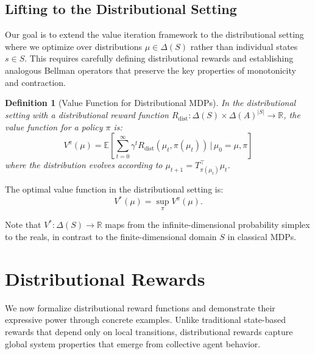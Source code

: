 \documentclass{article}
\newcommand{\ak}[1]{\textcolor{red}{ak: #1}}
\newtheorem{definition}{Definition}
\begin{document}


\subsection{Lifting to the Distributional Setting}

Our goal is to extend the value iteration framework to the distributional setting where we optimize over distributions $\mu \in \Delta(S)$ rather than individual states $s \in S$. This requires carefully defining distributional rewards and establishing analogous Bellman operators that preserve the key properties of monotonicity and contraction.

\begin{definition}[Value Function for Distributional MDPs]
In the distributional setting with a distributional reward function $R_{\text{dist}}: \Delta(S) \times \Delta(A)^{|S|} \to \mathbb{R}$, the value function for a policy $\pi$ is:
\[
V^\pi(\mu) = \mathbb{E}\left[\sum_{t=0}^{\infty} \gamma^t R_{\text{dist}}(\mu_t, \pi(\mu_t)) \,\Big|\, \mu_0 = \mu, \pi\right]
\]
where the distribution evolves according to $\mu_{t+1} = T_{\pi(\mu_t)}^\top \mu_t$.
\end{definition}

The optimal value function in the distributional setting is:
\[
V^*(\mu) = \sup_{\pi} V^\pi(\mu).
\]

Note that $V^*: \Delta(S) \to \mathbb{R}$ maps from the infinite-dimensional probability simplex to the reals, in contrast to the finite-dimensional domain $S$ in classical MDPs.






\section{Distributional Rewards}

We now formalize distributional reward functions and demonstrate their expressive power through concrete examples. Unlike traditional state-based rewards that depend only on local transitions, distributional rewards capture global system properties that emerge from collective agent behavior.
\end{document}
